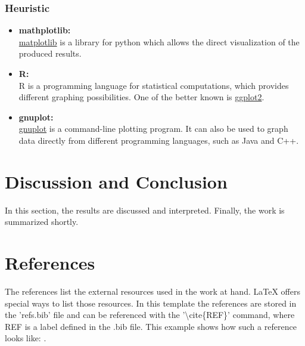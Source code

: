 \documentclass[twocolumn]{article}
\begin{document}
\subsubsection{Heuristic}


\begin{itemize}
	\item \textbf{mathplotlib:}\\ 
		\href{https://matplotlib.org/}{matplotlib} is a library for python which allows the direct visualization of the produced results.
	\item \textbf{R:}\\
		R is a programming language for statistical computations, which provides different graphing possibilities. One of the better known is \href{https://ggplot2.tidyverse.org/}{ggplot2}.
	\item \textbf{gnuplot:}\\
		\href{http://www.gnuplot.info/}{gnuplot} is a command-line plotting program. It can also be used to graph data directly from different programming languages, such as Java and C++.
\end{itemize}

\section{Discussion and Conclusion}
In this section, the results are discussed and interpreted. Finally, the work is summarized shortly.

\section{References}
The references list the external resources used in the work at hand. \LaTeX$ $  offers special ways to list those resources. In this template the references are stored in the 'refs.bib' file and can be referenced with the '\textbackslash$ $cite\{REF\}' command, where REF is a label defined in the .bib file. This example shows how such a reference looks like: \cite{exa}.



\end{document}
